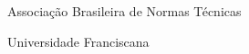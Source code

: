 %

\begin{siglas}
    \item[\textbf{ABNT}]    Associação Brasileira de Normas Técnicas
    \item[\textbf{UFN}]     Universidade Franciscana
\end{siglas}

